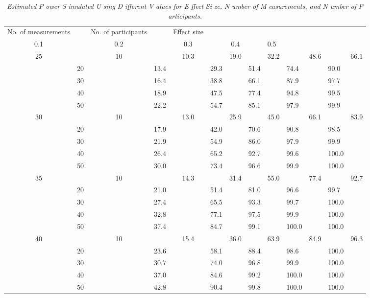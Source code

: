 \documentclass{article}
\begin{document}
  \begin{table}

  \caption{\emph{Estimated }\emph{P} \emph{ower }\emph{S} \emph{imulated }\emph{U} \emph{sing }\emph{D} \emph{ifferent }\emph{V} \emph{alues for }\emph{E} \emph{ffect }\emph{Si} \emph{ze, }\emph{N} \emph{umber of }\emph{M} \emph{easurements, and }\emph{N} \emph{umber of }\emph{P} \emph{articipants.} }
\label{Table 1}

  \begin{tabular}{c  c  c  c  c  c  c}

  No. of measurements &   & No. of participants &   & Effect size &  \\
0.1 &   & 0.2 &   & 0.3 &   & 0.4 &   & 0.5 &   &  & \\
25 &   & 10 &   & 10.3 &   & 19.0 &   & 32.2 &   & 48.6 &   & 66.1 &  \\
 & 20 &   & 13.4 &   & 29.3 &   & 51.4 &   & 74.4 &   & 90.0 &  \\
 & 30 &   & 16.4 &   & 38.8 &   & 66.1 &   & 87.9 &   & 97.7 &  \\
 & 40 &   & 18.9 &   & 47.5 &   & 77.4 &   & 94.8 &   & 99.5 &  \\
 & 50 &   & 22.2 &   & 54.7 &   & 85.1 &   & 97.9 &   & 99.9 &  \\
30 &   & 10 &   & 13.0 &   & 25.9 &   & 45.0 &   & 66.1 &   & 83.9 &  \\
 & 20 &   & 17.9 &   & 42.0 &   & 70.6 &   & 90.8 &   & 98.5 &  \\
 & 30 &   & 21.9 &   & 54.9 &   & 86.0 &   & 97.9 &   & 99.9 &  \\
 & 40 &   & 26.4 &   & 65.2 &   & 92.7 &   & 99.6 &   & 100.0 &  \\
 & 50 &   & 30.0 &   & 73.4 &   & 96.6 &   & 99.9 &   & 100.0 &  \\
35 &   & 10 &   & 14.3 &   & 31.4 &   & 55.0 &   & 77.4 &   & 92.7 &  \\
 & 20 &   & 21.0 &   & 51.4 &   & 81.0 &   & 96.6 &   & 99.7 &  \\
 & 30 &   & 27.4 &   & 65.5 &   & 93.3 &   & 99.7 &   & 100.0 &  \\
 & 40 &   & 32.8 &   & 77.1 &   & 97.5 &   & 99.9 &   & 100.0 &  \\
 & 50 &   & 37.4 &   & 84.7 &   & 99.1 &   & 100.0 &   & 100.0 &  \\
40 &   & 10 &   & 15.4 &   & 36.0 &   & 63.9 &   & 84.9 &   & 96.3 &  \\
 & 20 &   & 23.6 &   & 58.1 &   & 88.4 &   & 98.6 &   & 100.0 &  \\
 & 30 &   & 30.7 &   & 74.0 &   & 96.8 &   & 99.9 &   & 100.0 &  \\
 & 40 &   & 37.0 &   & 84.6 &   & 99.2 &   & 100.0 &   & 100.0 &  \\
 & 50 &   & 42.8 &   & 90.4 &   & 99.8 &   & 100.0 &   & 100.0 &  \\


\end{tabular}
 

\end{table}
\end{document}
